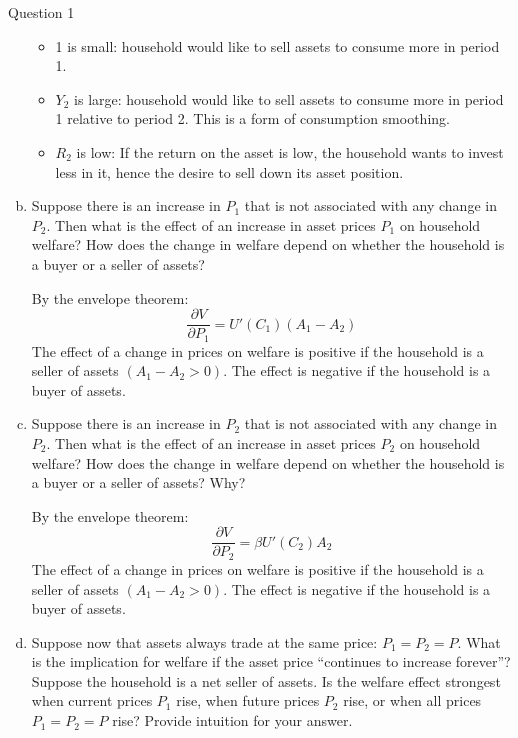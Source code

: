\documentclass[a4paper]{article}
\newif\IfInSansMode
\begin{document}
\begin{questionbox}{Question 1}
\begin{enumerate}[(a)]
\begin{explanationbox}
				\begin{itemize}
					\item 1 is small: household would like to sell assets to consume more in period 1. 
					\item \( Y_2 \) is large: household would like to sell assets to consume more in period 1 relative to period 2. This is a form of consumption smoothing.
					\item \( R_2 \) is low: If the return on the asset is low, the household wants to invest less in it, hence the desire to sell down its asset position.
				\end{itemize}
			\end{explanationbox}
			\item Suppose there is an increase in \( P_1 \) that is not associated with any change in \( P_2 \). Then what is the eﬀect of an increase in asset prices \( P_1 \) on household welfare? How does the change in welfare depend on whether the household is a buyer or a seller of assets?
			\begin{explanationbox}
				By the envelope theorem:
				\[
					\frac{\partial V}{\partial P_1} = U'(C_1)(A_1 - A_2)
				\]
				The effect of a change in prices on welfare is positive if the household is a seller of assets \( (A_1 - A_2 > 0) \). The eﬀect is negative if the household is a buyer of assets.
			\end{explanationbox}
			\item Suppose there is an increase in \( P_2 \) that is not associated with any change in \( P_2 \). Then what is the eﬀect of an increase in asset prices \( P_2 \) on household welfare? How does the change in welfare depend on whether the household is a buyer or a seller of assets? Why?
			\begin{explanationbox}
				By the envelope theorem:
				\[
					\frac{\partial V}{\partial P_2} = \beta U'(C_2)A_2
				\]
				The eﬀect of a change in prices on welfare is positive if the household is a seller of assets \( (A_1 - A_2 > 0) \). The eﬀect is negative if the household is a buyer of assets.
			\end{explanationbox}
			\item Suppose now that assets always trade at the same price: \( P_1 = P_2 = P \). What is the implication for welfare if the asset price ``continues to increase forever''? Suppose the household is a net seller of assets. Is the welfare eﬀect strongest when current prices \( P_1 \) rise, when future prices \( P_2 \) rise, or when all prices \( P_1 = P_2 = P \) rise? Provide intuition for your answer.

\end{enumerate}
\end{questionbox}
\end{document}
